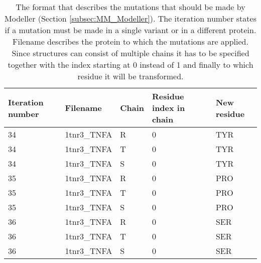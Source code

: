 \begin{table}[ht]
	\begin{tabular}{ l | l | l | l | l}
		Iteration number & Filename & Chain & Residue index in chain & New residue\\ \hline
		34 & 1tnr3\_TNFA & R & 0 & TYR\\
		34 & 1tnr3\_TNFA & T & 0 & TYR\\
		34 & 1tnr3\_TNFA & S & 0 & TYR\\
		35 & 1tnr3\_TNFA & R & 0 & PRO\\
		35 & 1tnr3\_TNFA & T & 0 & PRO\\
		35 & 1tnr3\_TNFA & S & 0 & PRO\\
		36 & 1tnr3\_TNFA & R & 0 & SER\\
		36 & 1tnr3\_TNFA & T & 0 & SER\\
		36 & 1tnr3\_TNFA & S & 0 & SER\\
	\end{tabular}
	\caption{The format that describes the mutations that should be made by Modeller (Section \ref{subsec:MM_Modeller}). The iteration number states if a mutation must be made in a single variant or in a different protein. Filename describes the protein to which the mutations are applied. Since structures can consist of multiple chains it has to be specified together with the index starting at 0 instead of 1 and finally to which residue it will be transformed.}
		\label{table:Res_Modeller_Mutation_Format}
\end{table}

